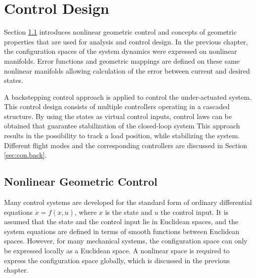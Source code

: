 \chapter{Control Design} \label{ch:control}

Section \ref{sec:con.nlgc} introduces nonlinear geometric control and concepts of geometric properties that are used for analysis and control design.  
In the previous chapter, the configuration spaces of the system dynamics were expressed on nonlinear manifolds.
Error functions and geometric mappings are defined on these same nonlinear manifolds allowing calculation of the error between current and desired states. 

A backstepping control approach is applied to control the under-actuated system.
This control design consists of multiple controllers operating in a cascaded structure.
By using the states as virtual control inputs, control laws can be obtained that guarantee stabilization of the closed-loop system 
This approach results in the possibility to track a load position, while stabilizing the system. 
Different flight modes and the corresponding controllers are discussed in Section \ref{sec:con.back}.



\newpage
\section{Nonlinear Geometric Control}\label{sec:con.nlgc}
Many control systems are developed for the standard form of ordinary differential equations $  \dot{x}=f(x,u)  $,
%
where $ x $ is the state and $ u $ the control input. It is assumed that the state and the control input lie in Euclidean spaces, and the system equations are defined in terms of smooth functions between Euclidean spaces. However, for many mechanical systems, the configuration space can only be expressed locally as a Euclidean space. 
A nonlinear space is required to express the configuration space globally, which is discussed in the previous chapter.

